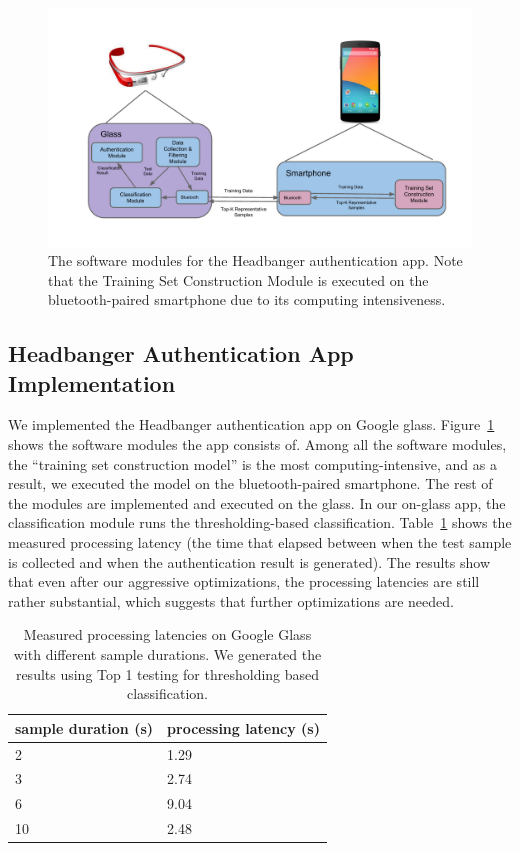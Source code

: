 \begin{figure}[t]
\centering
\includegraphics [width=.85\linewidth]{fig/sofware_architecture}
\caption{The software modules for the Headbanger authentication app. Note that the Training Set Construction Module is executed on the bluetooth-paired smartphone due to its computing intensiveness. \label{fig:software_arch}}
\end{figure}


\subsection{Headbanger Authentication App Implementation}
We implemented the Headbanger authentication app on Google glass. Figure~\ref{fig:software_arch} shows the software modules the app consists of. Among all the software modules, the ``training set construction model'' is the most computing-intensive, and as a result, we executed the model on the bluetooth-paired smartphone. The rest of the modules are implemented and executed on the glass. In our on-glass app, the classification module runs the thresholding-based classification. Table~\ref{tab:glass} shows the measured processing latency (the time that elapsed between when the test sample is collected and when the authentication result is generated). The results show that even after our aggressive optimizations, the processing latencies are still rather substantial, which suggests that further optimizations are needed.

\begin{table}[b]
\small\centering
\begin{tabular}{|l|l|}\hline
sample duration (s) & processing latency (s) \\\hline
2 & 1.29 \\\hline
3 & 2.74 \\\hline
6 & 9.04 \\\hline
10 & 2.48 \\\hline
\end{tabular}
\caption{Measured processing latencies on Google Glass with different sample durations. We generated the results using Top 1 testing for thresholding based classification.\label{tab:glass}}
\end{table}



